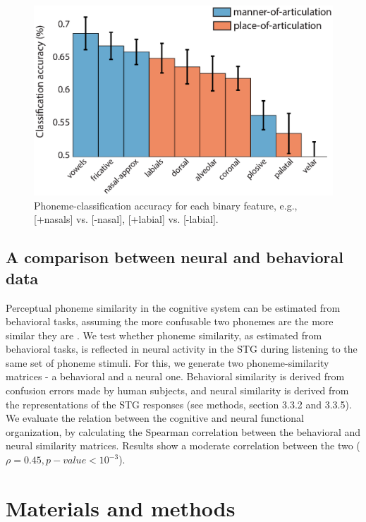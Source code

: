 \begin{figure}[h]
\vspace{.3in}
\includegraphics[width=\linewidth]{Figures/Ch3/Figure5_new.eps}
\caption{Phoneme-classification accuracy for each binary feature, e.g., [+nasals] vs. [-nasal], [+labial] vs. [-labial].}
\end{figure}

\subsection{A comparison between neural and behavioral data}
Perceptual phoneme similarity in the cognitive system can be estimated from behavioral tasks, assuming the more confusable two phonemes are the more similar they are \citep{Tversky1977, Shepard1987}. We test whether phoneme similarity, as estimated from behavioral tasks, is reflected in neural activity in the STG during listening to the same set of phoneme stimuli. For this, we generate two phoneme-similarity matrices - a behavioral and a neural one. Behavioral similarity is derived from confusion errors made by human subjects, and neural similarity is derived from the representations of the STG responses (see methods, section 3.3.2 and 3.3.5). We evaluate the relation between the cognitive and neural functional organization, by calculating the Spearman correlation between the behavioral and neural similarity matrices. Results show a moderate correlation between the two ($\rho = 0.45, p-value < 10^{-3}$).

\section{Materials and methods}
